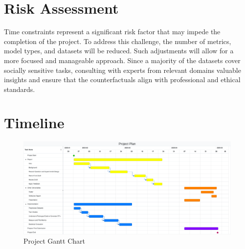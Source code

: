 \documentclass[a4paper,12pt]{article}
\begin{document}
\section*{Risk Assessment}
Time constraints represent a significant risk factor that may impede the completion of the project. To address this challenge, the number of metrics, model types, and datasets will be reduced. Such adjustments will allow for a more focused and manageable approach. Since a majority of the datasets cover socially sensitive tasks, consulting with experts from relevant domains valuable insights and ensure that the counterfactuals align with professional and ethical standards.

\section*{Timeline}
\begin{figure}[h]
    \centering
    \includegraphics[width=1\textwidth]{gnatt-chart.png}
    \caption{Project Gantt Chart}
    \label{fig:gantt_chart}
\end{figure}

\end{document}
